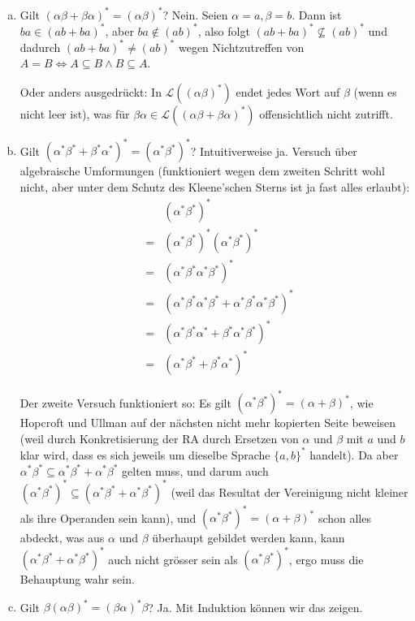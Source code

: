 \documentclass[11pt]{article} %
\theoremstyle{definition}
\begin{document}
\begin{enumerate}[(a)]

\item Gilt $(\alpha\beta + \beta\alpha)^* = (\alpha\beta)^*$? Nein. Seien $\alpha = a, \beta = b$. Dann ist $ba \in (ab + ba)^*$, aber $ba \notin (ab)^*$, also folgt $(ab + ba)^* \not\subseteq (ab)^*$ und dadurch $(ab + ba)^* \neq (ab)^*$ wegen Nichtzutreffen von $A = B \Leftrightarrow A \subseteq B \land B \subseteq A$.

Oder anders ausgedrückt: In $\mathcal{L}((\alpha\beta)^*)$ endet jedes Wort auf $\beta$ (wenn es nicht leer ist), was für $\beta\alpha \in \mathcal{L}((\alpha\beta + \beta\alpha)^*)$ offensichtlich nicht zutrifft.

\item Gilt $(\alpha^*\beta^* + \beta^*\alpha^*)^* = (\alpha^*\beta^*)^*$? Intuitiverweise ja. Versuch über algebraische Umformungen (funktioniert wegen dem zweiten Schritt wohl nicht, aber unter dem Schutz des Kleene'schen Sterns ist ja fast alles erlaubt):
\begin{eqnarray*}
&& (\alpha^*\beta^*)^* \\
&=& (\alpha^*\beta^*)^*(\alpha^*\beta^*)^* \\
&=& (\alpha^*\beta^*\alpha^*\beta^*)^* \\
&=& (\alpha^*\beta^*\alpha^*\beta^* + \alpha^*\beta^*\alpha^*\beta^*)^* \\
&=& (\alpha^*\beta^*\alpha^* + \beta^*\alpha^*\beta^*)^* \\
&=& (\alpha^*\beta^* + \beta^*\alpha^*)^*
\end{eqnarray*}

Der zweite Versuch funktioniert so: Es gilt $ (\alpha^*\beta^*)^* = (\alpha + \beta)^*$, wie Hopcroft und Ullman auf der nächsten nicht mehr kopierten Seite beweisen (weil durch Konkretisierung der RA durch Ersetzen von $\alpha$ und $\beta$ mit $a$ und $b$ klar wird, dass es sich jeweils um dieselbe Sprache $\{a, b\}^*$ handelt). Da aber $ \alpha^*\beta^* \subseteq \alpha^*\beta^* + \alpha^*\beta^*$ gelten muss, und darum auch $ (\alpha^*\beta^*)^* \subseteq (\alpha^*\beta^* + \alpha^*\beta^*)^*$ (weil das Resultat der Vereinigung nicht kleiner als ihre Operanden sein kann), und $(\alpha^*\beta^*)^* = (\alpha + \beta)^*$ schon alles abdeckt, was aus $\alpha$ und $\beta$ überhaupt gebildet werden kann, kann $(\alpha^*\beta^* + \alpha^*\beta^*)^*$ auch nicht grösser sein als $(\alpha^*\beta^*)^*$, ergo muss die Behauptung wahr sein.

\item Gilt $\beta(\alpha\beta)^* = (\beta\alpha)^*\beta$? Ja. Mit Induktion können wir das zeigen.


\end{enumerate}
\end{document}
